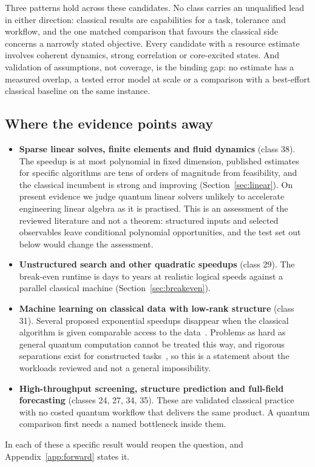\documentclass[10pt,a4paper]{article}
\begin{document}
Three patterns hold across these candidates. No class carries an unqualified lead in either direction: classical results are capabilities for a task, tolerance and workflow, and the one matched comparison that favours the classical side concerns a narrowly stated objective. Every candidate with a resource estimate involves coherent dynamics, strong correlation or core-excited states. And validation of assumptions, not coverage, is the binding gap: no estimate has a measured overlap, a tested error model at scale or a comparison with a best-effort classical baseline on the same instance.

\subsection{Where the evidence points away}
\begin{itemize}
\item \textbf{Sparse linear solves, finite elements and fluid dynamics} (class 38). The speedup is at most polynomial in fixed dimension, published estimates for specific algorithms are tens of orders of magnitude from feasibility, and the classical incumbent is strong and improving (Section~\ref{sec:linear}). On present evidence we judge quantum linear solvers unlikely to accelerate engineering linear algebra as it is practised. This is an assessment of the reviewed literature and not a theorem: structured inputs and selected observables leave conditional polynomial opportunities, and the test set out below would change the assessment.
\item \textbf{Unstructured search and other quadratic speedups} (class 29). The break-even runtime is days to years at realistic logical speeds against a parallel classical machine (Section~\ref{sec:breakeven}).
\item \textbf{Machine learning on classical data with low-rank structure} (class 31). Several proposed exponential speedups disappear when the classical algorithm is given comparable access to the data~\cite{tang2021,tang2023}. Problems as hard as general quantum computation cannot be treated this way, and rigorous separations exist for constructed tasks~\cite{liu2021}, so this is a statement about the workloads reviewed and not a general impossibility.
\item \textbf{High-throughput screening, structure prediction and full-field forecasting} (classes 24, 27, 34, 35). These are validated classical practice with no costed quantum workflow that delivers the same product. A quantum comparison first needs a named bottleneck inside them.
\end{itemize}
In each of these a specific result would reopen the question, and Appendix~\ref{app:forward} states it.
\end{document}

